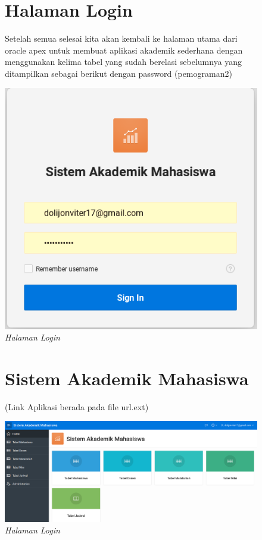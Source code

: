 \begin{enumerate}
\begin{figure}
    \section{Halaman Login}
    
    Setelah semua selesai kita akan kembali ke halaman utama dari oracle apex untuk membuat aplikasi akademik
    sederhana dengan menggunakan kelima tabel yang sudah berelasi sebelumnya
    yang ditampilkan sebagai berikut dengan password (pemograman2) 
    
        \begin{center}
    \includegraphics[scale=0.5]{figures/tugasdb3_8.png}
        \caption{\textit{Halaman Login}}
            \end{center}
    \label{gambar}
    \end{figure}

    \begin{figure}
        \section{Sistem Akademik Mahasiswa}
        (Link Aplikasi berada pada file url.ext)
            \begin{center}
        \includegraphics[scale=0.3]{figures/hasilAkhir.png}
            \caption{\textit{Halaman Login}}
                \end{center}
        \label{gambar}
        \end{figure}

\end{enumerate}




    

